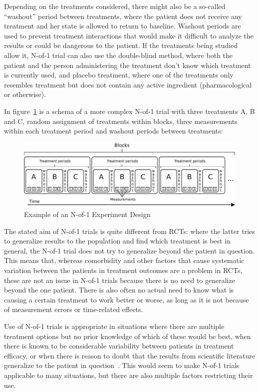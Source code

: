 \documentclass[12pt,a4paper,leqno]{report}
\theoremstyle{plain}
\theoremstyle{definition}
\theoremstyle{remark}
\begin{document}
Depending on the treatments considered, there might also be a so-called
``washout'' period between treatments, where the patient does not receive any
treatment and her state is allowed to return to baseline. Washout periods are used to
prevent treatment interactions that would make it difficult to analyze the
results or could be dangerous to the patient. If the treatments being studied
allow it, N-of-1 trial can also use the double-blind method, where both the patient
and the person administering the treatment don't know which treatment is currently used, and placebo
treatment, where one of the treatments only resembles treatment but does not
contain any active ingredient (pharmacological or otherwise).

In figure\ \ref{examplenof1schema} is a schema of a more complex N-of-1 trial with three treatments A, B and C,
random assignment of treatments within blocks, three measurements within each
treatment period and washout periods between treatments:

\begin{figure}[H]
    \centering
    \caption{Example of an N-of-1 Experiment Design}\label{examplenof1schema}
    \bigskip
    \includegraphics[width=\textwidth]{n-of-1_schema.pdf}
\end{figure}

The stated aim of N-of-1 trials is quite different from RCTs: where the latter
tries to generalize results to the population and find which treatment is best in
general, the N-of-1 trial does not try to generalize beyond the patient in question.
This means that, whereas comorbidity and other factors that cause systematic
variation between the patients in treatment outcomes are a problem in RCTs,
these are not an issue in N-of-1 trials because there is no need to generalize
beyond the one patient. There is also often no actual need to know what is
causing a certain treatment to work better or worse, as long as it is not
because of measurement errors or time-related effects.

Use of N-of-1 trials is appropriate in situations where there are multiple
treatment options but no prior knowledge of which of these would be
best, when there is known to be considerable variability between patients in
treatment efficacy, or when there is reason to doubt that the results from
scientific literature generalize to the patient in question\ \cite{nofone}. This
would seem to make N-of-1 trials applicable to many situations, but there are
also multiple factors restricting their use.
\end{document}
